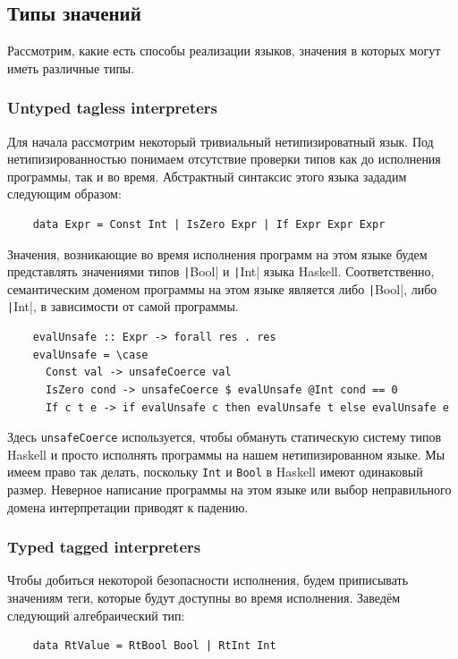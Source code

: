 \subsection{Типы значений}

Рассмотрим, какие есть способы реализации языков, значения в которых могут иметь различные типы.

\subsubsection{Untyped tagless interpreters}

Для начала рассмотрим некоторый тривиальный нетипизироватный язык.
Под нетипизированностью понимаем отсутствие проверки типов как до исполнения программы, так и во время.
Абстрактный синтаксис этого языка зададим следующим образом:
\begin{verbatim}
    data Expr = Const Int | IsZero Expr | If Expr Expr Expr
\end{verbatim}

Значения, возникающие во время исполнения программ на этом языке будем представлять значениями типов \texttt|Bool| и \texttt|Int| языка Haskell.
Соответственно, семантическим доменом программы на этом языке является либо \texttt|Bool|, либо \texttt|Int|, в зависимости от самой программы.
\begin{verbatim}
    evalUnsafe :: Expr -> forall res . res
    evalUnsafe = \case
      Const val -> unsafeCoerce val
      IsZero cond -> unsafeCoerce $ evalUnsafe @Int cond == 0
      If c t e -> if evalUnsafe c then evalUnsafe t else evalUnsafe e
\end{verbatim}

Здесь \texttt{unsafeCoerce} используется, чтобы обмануть статическую систему типов Haskell и просто исполнять программы на нашем нетипизированном языке.
Мы имеем право так делать, поскольку \texttt{Int} и \texttt{Bool} в Haskell имеют одинаковый размер.
Неверное написание программы на этом языке или выбор неправильного домена интерпретации приводят к падению.

\subsubsection{Typed tagged interpreters}

Чтобы добиться некоторой безопасности исполнения, будем приписывать значениям теги, которые будут доступны во время исполнения.
Заведём следующий алгебраический тип:
\begin{verbatim}
    data RtValue = RtBool Bool | RtInt Int
\end{verbatim}

